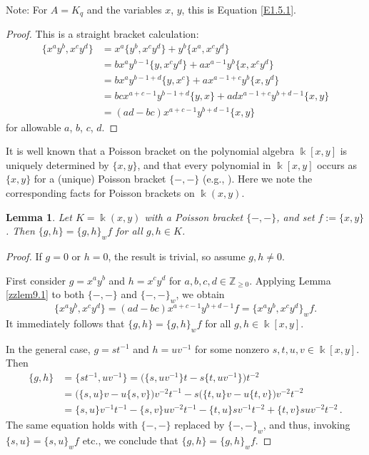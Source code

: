 \documentclass[12pt]{amsart}
\theoremstyle{plain}
\newtheorem{lemma}[theorem]{Lemma}
\numberwithin{theorem}{section}
\numberwithin{equation}{theorem}
\theoremstyle{definition}
\newcommand{\ZZ}{\mathbb{Z}}
\newcommand \Znn {\ZZ_{\ge 0}}
\begin{document}
Note: For $A= K_q$ and the variables $x$, $y$, this is Equation \eqref{E1.5.1}.

\begin{proof}
This is a straight bracket calculation:
\begin{align*}
\{ x^ay^b, x^cy^d \} &= x^a \{y^b, x^cy^d\} + y^b \{x^a,x^cy^d\}  \\
&= b x^a y^{b-1} \{y,x^cy^d\} + a x^{a-1} y^b \{x, x^cy^d \}  \\
&= b x^a y^{b-1+d} \{y,x^c\} + a x^{a-1+c} y^b \{x,y^d\}  \\
&= bc x^{a+c-1} y^{b-1+d} \{y,x\} + ad x^{a-1+c} y^{b+d-1} \{x,y\}  \\
&= (ad-bc) x^{a+c-1} y^{b+d-1} \{x,y\}
\end{align*}
for allowable $a$, $b$, $c$, $d$.
\end{proof}

It is well known that a Poisson bracket on the polynomial algebra $\Bbbk[x,y]$ is uniquely determined by $\{x,y\}$, and that every polynomial in $\Bbbk[x,y]$ occurs as $\{x,y\}$ for a (unique) Poisson bracket $\{-,-\}$ (e.g., \cite[p.235, last paragraph of \S9.1.1]{LGPV}).  Here we note the corresponding facts for Poisson brackets on $\Bbbk(x,y)$.

\begin{lemma}  \label{zzlem9.2}
Let $K = \Bbbk(x,y)$ with a Poisson bracket $\{-,-\}$, and set $f := \{x,y\}$. Then $\{g,h\} = \{g,h\}_wf$ for all $g,h \in K$.
\end{lemma}

\begin{proof}
If $g=0$ or $h=0$, the result is trivial, so assume $g,h \ne 0$.

First consider $g = x^ay^b$ and $h = x^cy^d$ for $a,b,c,d \in \Znn$. Applying Lemma \ref{zzlem9.1} to both $\{-,-\}$ and $\{-,-\}_w$, we obtain
$$
\{ x^ay^b, x^cy^d \} = (ad-bc) x^{a+c-1} y^{b+d-1} f = \{ x^ay^b, x^cy^d \}_w f.
$$
It immediately follows that $\{g,h\} = \{g,h\}_w f$ for all $g,h \in \Bbbk[x,y]$.

In the general case, $g = st^{-1}$ and $h = uv^{-1}$ for some nonzero $s,t,u,v \in \Bbbk[x,y]$. Then
\begin{align*}
\{g,h\} &= \{ st^{-1}, uv^{-1} \} = \bigl( \{s,uv^{-1}\} t - s \{t,uv^{-1}\} \bigr) t^{-2}  \\
&= \bigl( \{s,u\} v - u \{s,v\} \bigr) v^{-2} t^{-1} - s \bigl( \{t,u\} v - u \{t,v\} \bigr) v^{-2} t^{-2}  \\
&= \{s,u\} v^{-1} t^{-1} - \{s,v\} uv^{-2}t^{-1} - \{t,u\} sv^{-1}t^{-2} + \{t,v\} suv^{-2}t^{-2} \,.
\end{align*}
The same equation holds with $\{-,-\}$ replaced by $\{-,-\}_w$, and thus, invoking $\{s,u\} = \{s,u\}_w f$ etc., we conclude that $\{g,h\} = \{g,h\}_wf$.
\end{proof}
\end{document}
